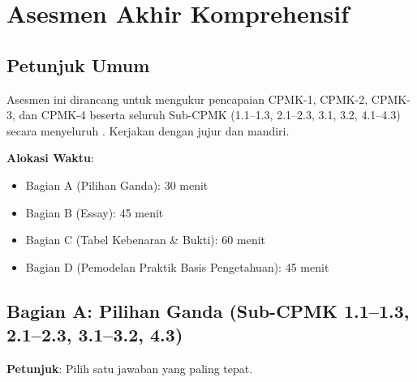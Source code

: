 \section{Asesmen Akhir Komprehensif}

\subsection{Petunjuk Umum}

Asesmen ini dirancang untuk mengukur pencapaian CPMK-1, CPMK-2, CPMK-3, dan CPMK-4 beserta seluruh Sub-CPMK (1.1--1.3, 2.1--2.3, 3.1, 3.2, 4.1--4.3) secara menyeluruh \cite{rosen2019}. Kerjakan dengan jujur dan mandiri.

\textbf{Alokasi Waktu}:
\begin{itemize}
  \item Bagian A (Pilihan Ganda): 30 menit
  \item Bagian B (Essay): 45 menit
  \item Bagian C (Tabel Kebenaran \& Bukti): 60 menit
  \item Bagian D (Pemodelan Praktik Basis Pengetahuan): 45 menit
\end{itemize}

\subsection{Bagian A: Pilihan Ganda (Sub-CPMK 1.1--1.3, 2.1--2.3, 3.1--3.2, 4.3)}

\textbf{Petunjuk}: Pilih satu jawaban yang paling tepat.

